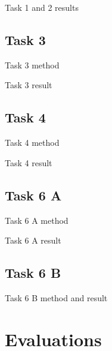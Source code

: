 \documentclass[screen, compress]{beamer}
\begin{document}
\begin{frame}{Task 1 and 2 results}
\end{frame}

\subsection{Task 3}
\begin{frame}{Task 3 method}
\end{frame}

\begin{frame}{Task 3 result}
\end{frame}

\subsection{Task 4}
\begin{frame}{Task 4 method}
\end{frame}

\begin{frame}{Task 4 result}
\end{frame}

\subsection{Task 6 A}
\begin{frame}{Task 6 A method}
\end{frame}

\begin{frame}{Task 6 A result}
\end{frame}

\subsection{Task 6 B}
\begin{frame}{Task 6 B method and result}
\end{frame}


\section{Evaluations}

\end{document}
